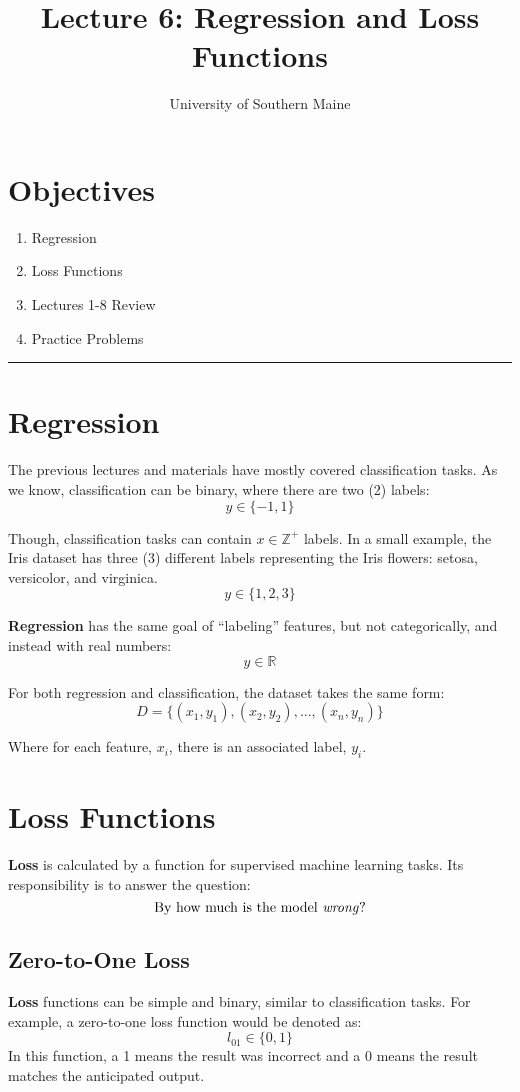 \documentclass[12pt]{article}
\title{Lecture 6: Regression and Loss Functions}
\author{University of Southern Maine}
\date{}
\begin{document}
\maketitle

\section*{Objectives}
\begin{enumerate}
    \item Regression
    \item Loss Functions
    \item Lectures 1-8 Review
    \item Practice Problems
\end{enumerate}

\rule[0.0051in]{\textwidth}{0.00025in}

\section{Regression}
The previous lectures and materials have mostly covered classification tasks. As we know, classification can be binary, where there are two (2) labels: 
\[
y \in \{-1, 1\}
\]

Though, classification tasks can contain \(x \in \mathbb{Z}^+\) labels. In a small example, the Iris dataset has three (3) different labels representing the Iris flowers: setosa, versicolor, and virginica.
\[
y \in \{1, 2, 3\}
\]

\textbf{Regression} has the same goal of ``labeling'' features, but not categorically, and instead with real numbers:
\[
y \in \mathbb{R}
\]

For both regression and classification, the dataset takes the same form:
\[
D = \{(x_1, y_1), (x_2, y_2),...,(x_n, y_n)\}
\]

Where for each feature, \(x_i\), there is an associated label, \(y_i\).

\section{Loss Functions}
\textbf{Loss} is calculated by a function for supervised machine learning tasks. Its responsibility is to answer the question: 
\[
\text{By how much is the model \textit{wrong}?}
\]

\subsection{Zero-to-One Loss}
\textbf{Loss} functions can be simple and binary, similar to classification tasks. For example, a zero-to-one loss function would be denoted as:
\[
l_{01} \in \{0, 1\}
\]
In this function, a 1 means the result was incorrect and a 0 means the result matches the anticipated output.
\end{document}
